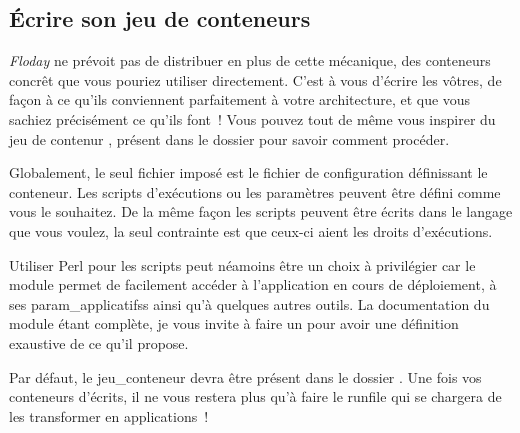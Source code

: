 \subsection{Écrire son jeu de conteneurs}

\emph{Floday} ne prévoit pas de distribuer en plus de cette mécanique, des conteneurs concrêt que vous pouriez utiliser directement.
C'est à vous d'écrire les vôtres, de façon à ce qu'ils conviennent parfaitement à votre architecture, et que vous sachiez précisément ce qu'ils font~!
Vous pouvez tout de même vous inspirer du jeu de contenur , présent dans le dossier  pour savoir comment procéder.

Globalement, le seul fichier imposé est le fichier de configuration définissant le conteneur.
Les scripts d'exécutions ou les paramètres peuvent être défini comme vous le souhaitez.
De la même façon les scripts peuvent être écrits dans le langage que vous voulez, la seul contrainte est que ceux-ci aient les droits d'exécutions.

Utiliser Perl pour les scripts peut néamoins être un choix à privilégier car le module  permet de facilement accéder à l'\gls{application} en cours de déploiement, à ses \glspl{param_applicatifs} ainsi qu'à quelques autres outils.
La documentation du module étant complète, je vous invite à faire un  pour avoir une définition exaustive de ce qu'il propose.

Par défaut, le \gls{jeu_conteneur} devra être présent dans le dossier .
Une fois vos conteneurs d'écrits, il ne vous restera plus qu'à faire le \gls{runfile} qui se chargera de les transformer en applications~!
